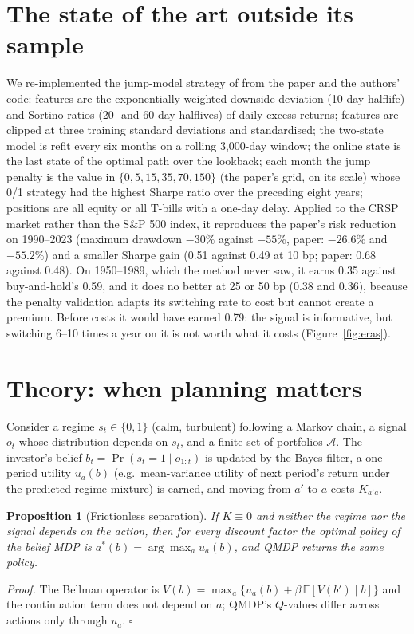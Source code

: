 \documentclass[sigconf,nonacm]{acmart}
\newtheorem{proposition}{Proposition}
\begin{document}
\section{The state of the art outside its sample}\label{sec:sjm}
We re-implemented the jump-model strategy of \citet{shu2024downside} from the paper and the authors' code: features are the exponentially weighted downside deviation (10-day halflife) and Sortino ratios (20- and 60-day halflives) of daily excess returns; features are clipped at three training standard deviations and standardised; the two-state model is refit every six months on a rolling 3,000-day window; the online state is the last state of the optimal path over the lookback; each month the jump penalty is the value in $\{0,5,15,35,70,150\}$ (the paper's grid, on its scale) whose 0/1 strategy had the highest Sharpe ratio over the preceding eight years; positions are all equity or all T-bills with a one-day delay. Applied to the CRSP market rather than the S\&P 500 index, it reproduces the paper's risk reduction on 1990--2023 (maximum drawdown $-30\%$ against $-55\%$, paper: $-26.6\%$ and $-55.2\%$) and a smaller Sharpe gain (0.51 against 0.49 at 10 bp; paper: 0.68 against 0.48). On 1950--1989, which the method never saw, it earns 0.35 against buy-and-hold's 0.59, and it does no better at 25 or 50 bp (0.38 and 0.36), because the penalty validation adapts its switching rate to cost but cannot create a premium. Before costs it would have earned 0.79: the signal is informative, but switching 6--10 times a year on it is not worth what it costs (Figure~\ref{fig:eras}).

\section{Theory: when planning matters}\label{sec:theory}
Consider a regime $s_t\in\{0,1\}$ (calm, turbulent) following a Markov chain, a signal $o_t$ whose distribution depends on $s_t$, and a finite set of portfolios $\mathcal{A}$. The investor's belief $b_t=\Pr(s_t=1\mid o_{1:t})$ is updated by the Bayes filter, a one-period utility $u_a(b)$ (e.g.\ mean-variance utility of next period's return under the predicted regime mixture) is earned, and moving from $a'$ to $a$ costs $K_{a'a}$.

\begin{proposition}[Frictionless separation]\label{prop:sep}
If $K\equiv0$ and neither the regime nor the signal depends on the action, then for every discount factor the optimal policy of the belief MDP is $a^*(b)=\arg\max_a u_a(b)$, and QMDP returns the same policy.
\end{proposition}
\emph{Proof.} The Bellman operator is $V(b)=\max_a\{u_a(b)+\beta\,\mathbb{E}[V(b')\mid b]\}$ and the continuation term does not depend on $a$; QMDP's $Q$-values differ across actions only through $u_a$. $\square$
\end{document}
